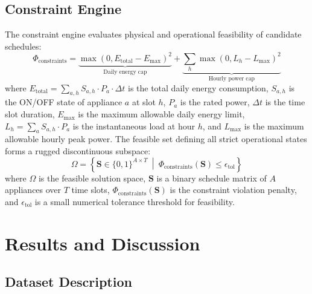 \documentclass[journal]{IEEEtran}
\begin{document}
\subsection{Constraint Engine}

The constraint engine evaluates physical and operational feasibility of candidate schedules:
\begin{equation}
    \Phi_{\text{constraints}} = \underbrace{\max\left(0, E_{\text{total}} - E_{\max}\right)^2}_{\text{Daily energy cap}} + \underbrace{\sum_h \max\left(0, L_h - L_{\max}\right)^2}_{\text{Hourly power cap}}
    \label{eq:constraints}
\end{equation}
where $E_{\text{total}} = \sum_{a,h} S_{a,h} \cdot P_a \cdot \Delta t$ is the total daily energy consumption, $S_{a,h}$ is the ON/OFF state of appliance $a$ at slot $h$, $P_a$ is the rated power, $\Delta t$ is the time slot duration, $E_{\max}$ is the maximum allowable daily energy limit, $L_h = \sum_a S_{a,h} \cdot P_a$ is the instantaneous load at hour $h$, and $L_{\max}$ is the maximum allowable hourly peak power. The feasible set defining all strict operational states forms a rugged discontinuous subspace:
\begin{equation}
    \Omega = \left\{ \mathbf{S} \in \{0,1\}^{A \times T} \ \middle| \ \Phi_{\text{constraints}}(\mathbf{S}) \leq \epsilon_{\text{tol}} \right\}
    \label{eq:feasible_space}
\end{equation}
where $\Omega$ is the feasible solution space, $\mathbf{S}$ is a binary schedule matrix of $A$ appliances over $T$ time slots, $\Phi_{\text{constraints}}(\mathbf{S})$ is the constraint violation penalty, and $\epsilon_{\text{tol}}$ is a small numerical tolerance threshold for feasibility.

\section{Results and Discussion}



\subsection{Dataset Description}
\end{document}
